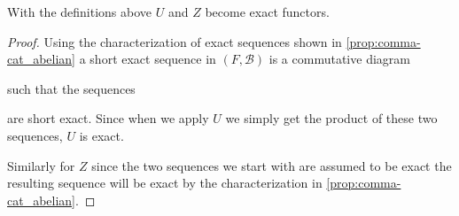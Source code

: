 \begin{prop}
	With the definitions above $U$ and $Z$ become exact functors.
	\begin{proof}
		Using the characterization of exact sequences shown in \cref{prop:comma-cat_abelian} a short exact sequence in $(F, \mathcal B)$ is a commutative diagram
		\begin{center}
		\end{center}
		such that the sequences 
		\begin{center}
		\end{center}
		are short exact. Since when we apply $U$ we simply get the product of these two sequences, $U$ is exact.
		
		Similarly for $Z$ since the two sequences we start with are assumed to be exact the resulting sequence will be exact by the characterization in \cref{prop:comma-cat_abelian}.
	\end{proof}
\end{prop}

